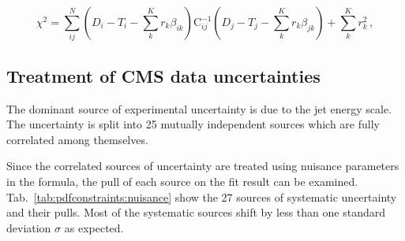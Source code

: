 \begin{equation}
  \chi^2 = \sum_{ij}^N \left(D_i - T_i - \sum_k^K r_k \beta_{ik}\right) \mathrm{C}_{ij}^{-1}
  \left(D_j - T_j - \sum_k^K r_k \beta_{jk} \right) + \sum_k^K r_k^2\,,
  \label{chi2_nuisance}
\end{equation}


\subsection{Treatment of CMS data uncertainties}
\label{section:cmsdatauncertainties}

The dominant source of experimental uncertainty is due to the jet energy scale.
The uncertainty is split into 25 mutually independent sources which are fully
correlated among themselves. 

Since the correlated sources of uncertainty are treated using nuisance
parameters in the \chisq formula, the pull of each source on the fit result can
be examined. Tab.~\ref{tab:pdfconstraints:nuisance} show the 27 sources of
systematic uncertainty and their pulls. Most of the systematic sources shift by
less than one standard deviation $\sigma$ as expected.


